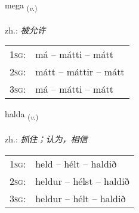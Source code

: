 \documentclass[frontgrid, backgrid]{flacards}\usepackage[]{graphicx}\usepackage[]{xcolor}
\begin{document}
\renewcommand{\blhead}{\vskip5pt {\small\bfseries\footnotesize Sagnorð | 动词 }}
\renewcommand{\bcfoot}{\vskip5pt \hspace{2pt}{\small\bfseries\footnotesize 1K}}


{mega \small{\textsubscript{(\textit{v.})}} \\[1ex] %
\textphonetic{[meiːɣa]} \\
zh.: \emph{被允许} \\  [2ex]
\renewcommand*{\arraystretch}{0.8}
\begin{tabular}{p{1cm}l}
\textsc{1sg}: & má -- mátti -- mátt \\ 
\textsc{2sg}: & mátt -- máttir -- mátt \\ 
\textsc{3sg}: & má -- mátti -- mátt \\ 
\end{tabular}
}

\renewcommand{\flhead}{\vskip5pt \fboxsep=0pt {\small\bfseries\footnotesize Sagnorð | 动词}}
\renewcommand{\fcfoot}{\vskip5pt \fboxsep=0pt \hspace{2pt}{\small\bfseries\footnotesize 1K}}

\renewcommand{\blhead}{\vskip5pt {\small\bfseries\footnotesize Sagnorð | 动词 }}
\renewcommand{\bcfoot}{\vskip5pt \hspace{2pt}{\small\bfseries\footnotesize 1K}}


{halda \small{\textsubscript{(\textit{v.})}} \\[1ex] %
\textphonetic{[halta]} \\
zh.: \emph{抓住；认为，相信} \\  [2ex]
\renewcommand*{\arraystretch}{0.8}
\begin{tabular}{p{1cm}l}
\textsc{1sg}: & held -- hélt -- haldið \\ 
\textsc{2sg}: & heldur -- hélst -- haldið \\ 
\textsc{3sg}: & heldur -- hélt -- haldið \\ 
\end{tabular}
}

\renewcommand{\flhead}{\vskip5pt \fboxsep=0pt {\small\bfseries\footnotesize Fornafn | 代词}}
\renewcommand{\fcfoot}{\vskip5pt \fboxsep=0pt \hspace{2pt}{\small\bfseries\footnotesize 1K}}
\end{document}
